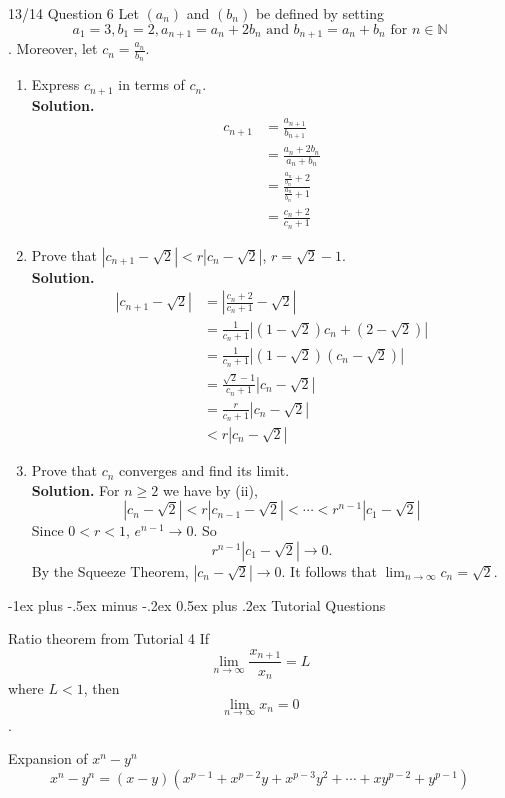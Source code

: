 \documentclass[10pt,landscape]{article}
\makeatletter
\renewcommand{\section}{\@startsection{section}{1}{0mm}%
                                {-1ex plus -.5ex minus -.2ex}%
                                {0.5ex plus .2ex}%
                                {\normalfont\large\bfseries}}
\theoremstyle{definition}
\newcommand{\thistheoremname}{}
\newtheorem*{genericthm*}{\thistheoremname}
\newenvironment{namedthm*}[1]
{\renewcommand{\thistheoremname}{#1}\begin{genericthm*}}
{\end{genericthm*}}
\makeatother
\begin{document}
\begin{multicols}{3}
\begin{namedthm*}{13/14 Question 6}
Let $(a_n)$ and $(b_n)$ be defined by setting $$a_1 = 3, b_1 = 2, a_{n+1} = a_n+ 2b_n \text{ and } b_{n+1}= a_n + b_n \text{ for } n \in \mathbb{N}$$. Moreover, let $c_n = \frac{a_n}{b_n}$.
\begin{enumerate}
    \item Express $c_{n+1}$ in terms of $c_{n}$.
    \\\textbf{Solution.} \begin{align*}
        c_{n+1}&=\frac{a_{n+1}}{b_{n+1}}
        \\&=\frac{a_n+2b_{n}}{a_{n}+b_{n}}
        \\&=\frac{\frac{a_n}{b_n} + 2}{\frac{a_n}{b_n} + 1}
        \\&=\frac{c_n + 2}{c_n+1}
    \end{align*}
    \item Prove that $\left|c_{n+1}-\sqrt{2}\right| < r\left|c_{n}-\sqrt{2}\right|$, $r= \sqrt{2}-1$.
    \\\textbf{Solution.} \begin{align*}
        \left|c_{n+1}-\sqrt{2}\right|&=\left|\frac{c_n + 2}{c_n + 1}-\sqrt{2}\right|
        \\&=\frac{1}{c_n + 1}\left|\left(1-\sqrt{2}\right)c_{n} + \left(2- \sqrt{2}\right)\right|
        \\&=\frac{1}{c_n + 1}\left|\left(1-\sqrt{2}\right)\left(c_n- \sqrt{2}\right)\right|
        \\&=\frac{\sqrt{2}-1}{c_n + 1}\left|c_{n} - \sqrt{2}\right|
        \\&=\frac{r}{c_n + 1}\left|c_{n} - \sqrt{2}\right|
        \\& < r\left|c_{n} - \sqrt{2}\right|
    \end{align*}
    \item Prove that $c_{n}$ converges and find its limit.
    \\\textbf{Solution.} For $n \geq 2$ we have by (ii),
    $$\left|c_n-\sqrt{2} \right|< r\left|c_{n-1}-\sqrt{2} \right|<\cdots<r^{n-1}\left|c_{1}-\sqrt{2} \right|$$
    Since $0 < r < 1$, $e^{n-1} \rightarrow 0$. So $$r^{n-1}\left|c_{1}-\sqrt{2} \right| \rightarrow 0.$$ By the Squeeze Theorem, $\left|c_{n}-\sqrt{2} \right| \rightarrow 0$. It follows that $\lim_{n \rightarrow \infty}{c_n} = \sqrt{2}$.
\end{enumerate}
\end{namedthm*}
\section{Tutorial Questions}
\begin{namedthm*}{Ratio theorem from Tutorial 4}
If $$\lim_{n \rightarrow \infty}{\frac{x_{n+1}}{x_n}}=L$$ where $L < 1$, then $$\lim_{n \rightarrow \infty}{x_n} = 0$$.
\end{namedthm*}
\begin{namedthm*}{Expansion of $x^n - y^n$}
$$x^n - y^n = (x-y)(x^{p-1}+x^{p-2}y+x^{p-3}y^{2}+ \cdots +xy^{p-2}+y^{p-1})$$
\end{namedthm*}


\end{multicols}
\end{document}
